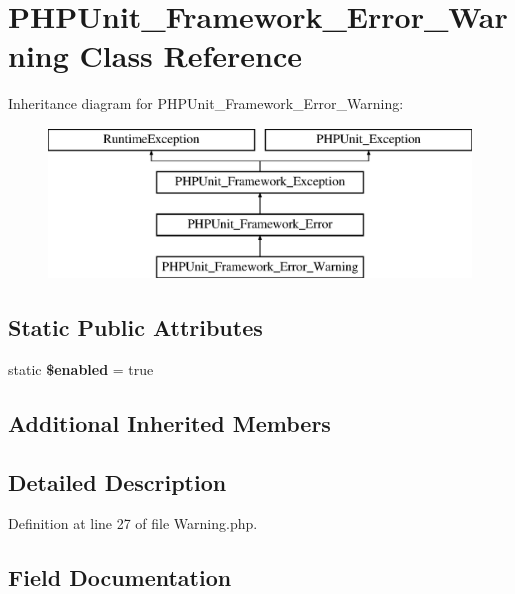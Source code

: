 \section{P\+H\+P\+Unit\+\_\+\+Framework\+\_\+\+Error\+\_\+\+Warning Class Reference}
\label{class_p_h_p_unit___framework___error___warning}
Inheritance diagram for P\+H\+P\+Unit\+\_\+\+Framework\+\_\+\+Error\+\_\+\+Warning\+:\begin{figure}[H]
\begin{center}
\leavevmode
\includegraphics[height=4.000000cm]{class_p_h_p_unit___framework___error___warning}
\end{center}
\end{figure}
\subsection*{Static Public Attributes}
\begin{DoxyCompactItemize}
\item 
static {\bf \$enabled} = true
\end{DoxyCompactItemize}
\subsection*{Additional Inherited Members}


\subsection{Detailed Description}


Definition at line 27 of file Warning.\+php.



\subsection{Field Documentation}
